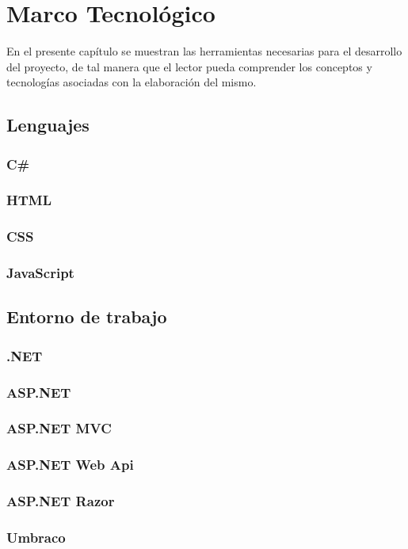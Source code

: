 \chapter{Marco Tecnológico}
En el presente capítulo se muestran las herramientas necesarias para el desarrollo del proyecto, de tal manera que el lector pueda comprender los conceptos y tecnologías asociadas con la elaboración del mismo.

\section{Lenguajes}
\subsection{C\#}
\subsection{HTML}

\subsection{CSS}
\subsection{JavaScript}

\section{Entorno de trabajo}
\subsection{.NET}
\subsection{ASP.NET}
\subsection{ASP.NET MVC}
\subsection{ASP.NET Web Api}
\subsection{ASP.NET Razor}
\subsection{Umbraco}

